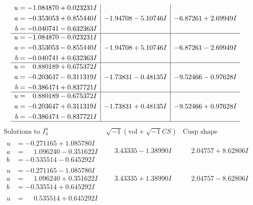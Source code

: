 \documentclass[1p]{elsarticle_modified}
\theoremstyle{definition}
\newcommand{\I}{\sqrt{-1}}
\begin{document}
$$\begin{array}{c|c|c}
\begin{aligned}
u &= -1.084870 + 0.023231 I \\
a &= -0.353053 + 0.855440 I \\
b &= -0.040741 - 0.632363 I\end{aligned}
 & -1.94708 - 5.10746 I & -6.87261 + 2.69949 I \\ \hline\begin{aligned}
u &= -1.084870 - 0.023231 I \\
a &= -0.353053 - 0.855440 I \\
b &= -0.040741 + 0.632363 I\end{aligned}
 & -1.94708 + 5.10746 I & -6.87261 - 2.69949 I \\ \hline\begin{aligned}
u &= \phantom{-}0.880189 + 0.675372 I \\
a &= -0.203647 - 0.311319 I \\
b &= -0.386474 + 0.837721 I\end{aligned}
 & -1.73831 - 0.48135 I & -9.52466 - 0.97628 I \\ \hline\begin{aligned}
u &= \phantom{-}0.880189 - 0.675372 I \\
a &= -0.203647 + 0.311319 I \\
b &= -0.386474 - 0.837721 I\end{aligned}
 & -1.73831 + 0.48135 I & -9.52466 + 0.97628 I\\
 \hline 
 \end{array}$$\newpage$$\begin{array}{c|c|c}  
\text{Solutions to }I^u_{4}& \I (\text{vol} + \sqrt{-1}CS) & \text{Cusp shape}\\
 \hline 
\begin{aligned}
u &= -0.271165 + 1.085780 I \\
a &= \phantom{-}1.096240 - 0.351622 I \\
b &= -0.535514 - 0.645292 I\end{aligned}
 & \phantom{-}3.43335 - 1.38990 I & \phantom{-}2.04757 + 8.62806 I \\ \hline\begin{aligned}
u &= -0.271165 - 1.085780 I \\
a &= \phantom{-}1.096240 + 0.351622 I \\
b &= -0.535514 + 0.645292 I\end{aligned}
 & \phantom{-}3.43335 + 1.38990 I & \phantom{-}2.04757 - 8.62806 I \\ \hline\begin{aligned}
u &= \phantom{-}0.535514 + 0.645292 I \\

\end{aligned}
\end{array}$$
\end{document}
